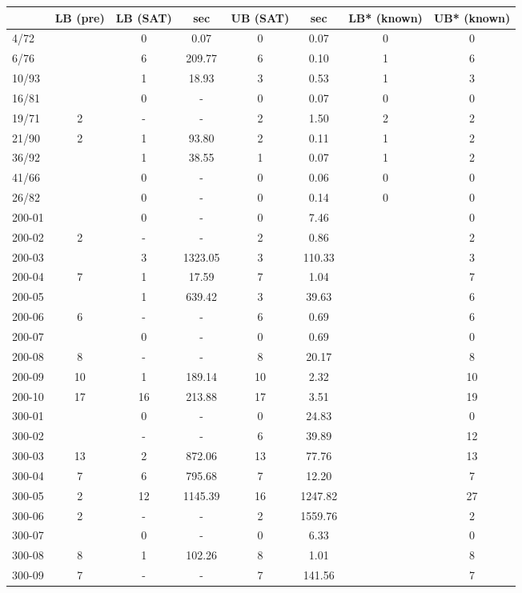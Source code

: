 \begin{tabular}{ l|c|cc|cc|cc  }
	&LB (pre)	&LB (SAT)	&sec	&UB (SAT)	&sec	&LB* (known)	&UB* (known)\\
    \hline
4/72	&	&0	&0.07	&0	&0.07	&0	&0\\
6/76	&	&6	&209.77	&6	&0.10	&1	&6\\
10/93	&	&1	&18.93	&3	&0.53	&1	&3\\
16/81	&	&0	&-	&0	&0.07	&0	&0\\
19/71	&2	&-	&-	&2	&1.50	&2	&2\\
21/90	&2	&1	&93.80	&2	&0.11	&1	&2\\
36/92	&	&1	&38.55	&1	&0.07	&1	&2\\
41/66	&	&0	&-	&0	&0.06	&0	&0\\
26/82	&	&0	&-	&0	&0.14	&0	&0\\
200-01	&	&0	&-	&0	&7.46	&	&0\\
200-02	&2	&-	&-	&2	&0.86	&	&2\\
200-03	&	&3	&1323.05	&3	&110.33	&	&3\\
200-04	&7	&1	&17.59	&7	&1.04	&	&7\\
200-05	&	&1	&639.42	&3	&39.63	&	&6\\
200-06	&6	&-	&-	&6	&0.69	&	&6\\
200-07	&	&0	&-	&0	&0.69	&	&0\\
200-08	&8	&-	&-	&8	&20.17	&	&8\\
200-09	&10	&1	&189.14	&10	&2.32	&	&10\\
200-10	&17	&16	&213.88	&17	&3.51	&	&19\\
300-01	&	&0	&-	&0	&24.83	&	&0\\
300-02	&	&-	&-	&6	&39.89	&	&12\\
300-03	&13	&2	&872.06	&13	&77.76	&	&13\\
300-04	&7	&6	&795.68	&7	&12.20	&	&7\\
300-05	&2	&12	&1145.39	&16	&1247.82	&	&27\\
300-06	&2	&-	&-	&2	&1559.76	&	&2\\
300-07	&	&0	&-	&0	&6.33	&	&0\\
300-08	&8	&1	&102.26	&8	&1.01	&	&8\\
300-09	&7	&-	&-	&7	&141.56	&	&7\\

\end{tabular}
